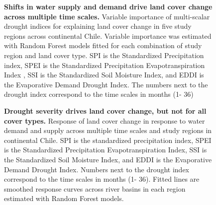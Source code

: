 \documentclass[
  sn-nature,
  numbered]{sn-jnl}
\begin{document}
\begin{figure}[!ht]


\caption{\label{fig-rel_import_RF}\textbf{Shifts in water supply and
demand drive land cover change across multiple time scales.} Variable
importance of multi-scalar drought indices for explaining land cover
change in five study regions across continental Chile. Variable
importance was estimated with Random Forest models fitted for each
combination of study region and land cover type. SPI is the Standardized
Precipitation index, SPEI is the Standardized Precipitation
Evapotranspiration Index , SSI is the Standardized Soil Moisture Index,
and EDDI is the Evaporative Demand Drought Index. The numbers next to
the drought index correspond to the time scales in months (1- 36)}

\end{figure}%

\begin{figure}[!ht]


\caption{\label{fig-parcial_variation}\textbf{Drought severity drives
land cover change, but not for all cover types.} Response of land cover
change in response to water demand and supply across multiple time
scales and study regions in continental Chile. SPI is the standardized
precipitation index, SPEI is the Standardized Precipitation
Evapotranspiration Index, SSI is the Standardized Soil Moisture Index,
and EDDI is the Evaporative Demand Drought Index. Numbers next to the
drought index correspond to the time scales in months (1- 36). Fitted
lines are smoothed response curves across river basins in each region
estimated with Random Forest models.}

\end{figure}%
\end{document}
